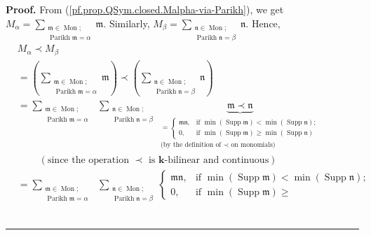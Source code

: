 \documentclass[numbers=enddot,12pt,final,onecolumn,notitlepage,abstracton]{scrartcl}%
\theoremstyle{definition}
\newenvironment{proof}[1][Proof]{\noindent\textbf{#1.} }{\ \rule{0.5em}{0.5em}}
\newenvironment{verlong}{}{}
\let\sumnonlimits\sum
\renewcommand{\sum}{\sumnonlimits\limits}
\begin{document}
\begin{proof}
\begin{verlong}
From (\ref{pf.prop.QSym.closed.Malpha-via-Parikh}), we get $M_{\alpha}%
=\sum_{\substack{\mathfrak{m}\in\operatorname*{Mon};\\\operatorname*{Parikh}%
\mathfrak{m}=\alpha}}\mathfrak{m}$. Similarly, $M_{\beta}=\sum
_{\substack{\mathfrak{n}\in\operatorname*{Mon};\\\operatorname*{Parikh}%
\mathfrak{n}=\beta}}\mathfrak{n}$. Hence,%
\begin{align*}
&  M_{\alpha}\left.  \prec\right.  M_{\beta}\\
&  =\left(  \sum_{\substack{\mathfrak{m}\in\operatorname*{Mon}%
;\\\operatorname*{Parikh}\mathfrak{m}=\alpha}}\mathfrak{m}\right)  \left.
\prec\right.  \left(  \sum_{\substack{\mathfrak{n}\in\operatorname*{Mon}%
;\\\operatorname*{Parikh}\mathfrak{n}=\beta}}\mathfrak{n}\right) \\
&  =\sum_{\substack{\mathfrak{m}\in\operatorname*{Mon}%
;\\\operatorname*{Parikh}\mathfrak{m}=\alpha}}\ \ \sum_{\substack{\mathfrak{n}%
\in\operatorname*{Mon};\\\operatorname*{Parikh}\mathfrak{n}=\beta
}}\underbrace{\mathfrak{m}\left.  \prec\right.  \mathfrak{n}}_{\substack{=%
\begin{cases}
\mathfrak{mn}, & \text{if }\min\left(  \operatorname*{Supp}\mathfrak{m}%
\right)  <\min\left(  \operatorname*{Supp}\mathfrak{n}\right)  ;\\
0, & \text{if }\min\left(  \operatorname*{Supp}\mathfrak{m}\right)  \geq
\min\left(  \operatorname*{Supp}\mathfrak{n}\right)
\end{cases}
\\\text{(by the definition of }\left.  \prec\right.  \text{ on monomials)}}}\\
&  \ \ \ \ \ \ \ \ \ \ \left(  \text{since the operation }\left.
\prec\right.  \text{ is }\mathbf{k}\text{-bilinear and continuous}\right) \\
&  =\sum_{\substack{\mathfrak{m}\in\operatorname*{Mon}%
;\\\operatorname*{Parikh}\mathfrak{m}=\alpha}}\ \ \sum_{\substack{\mathfrak{n}%
\in\operatorname*{Mon};\\\operatorname*{Parikh}\mathfrak{n}=\beta}}%
\begin{cases}
\mathfrak{mn}, & \text{if }\min\left(  \operatorname*{Supp}\mathfrak{m}%
\right)  <\min\left(  \operatorname*{Supp}\mathfrak{n}\right)  ;\\
0, & \text{if }\min\left(  \operatorname*{Supp}\mathfrak{m}\right)  \geq

\end{cases}
\end{align*}
\end{verlong}
\end{proof}
\end{document}

